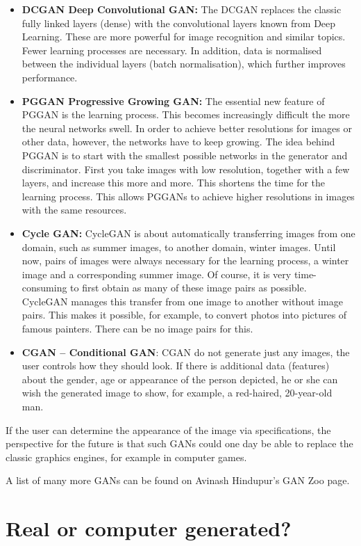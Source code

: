 \begin{itemize}
  \item \textbf{DCGAN Deep Convolutional GAN:} The DCGAN replaces the classic fully linked layers (dense) with the convolutional layers known from Deep Learning. These are more powerful for image recognition and similar topics. Fewer learning processes are necessary. In addition, data is normalised between the individual layers (batch normalisation), which further improves performance.
  \item \textbf{PGGAN Progressive Growing GAN:} The essential new feature of PGGAN is the learning process. This becomes increasingly difficult the more the neural networks swell. In order to achieve better resolutions for images or other data, however, the networks have to keep growing. The idea behind PGGAN is to start with the smallest possible networks in the generator and discriminator. First you take images with low resolution, together with a few layers, and increase this more and more. This shortens the time for the learning process. This allows PGGANs to achieve higher resolutions in images with the same resources.
  \item \textbf{Cycle GAN:} CycleGAN is about automatically transferring images from one domain, such as summer images, to another domain, winter images. Until now, pairs of images were always necessary for the learning process, a winter image and a corresponding summer image. Of course, it is very time- consuming to first obtain as many of these image pairs as possible. CycleGAN manages this transfer from one image to another without image pairs. This makes it possible, for example, to convert photos into pictures of famous painters. There can be no image pairs for this.
  \item \textbf{CGAN – Conditional GAN}: CGAN do not generate just any images, the user controls how they should look. If there is additional data (features) about the gender, age or appearance of the person depicted, he or she can wish the generated image to show, for example, a red-haired, 20-year-old man.
\end{itemize}


If the user can determine the appearance of the image via specifications, the perspective for the future is that such GANs could one day be able to replace the classic graphics engines, for example in computer games.

A list of many more GANs can be found on Avinash Hindupur's GAN Zoo page.

\section{Real or computer generated?}

